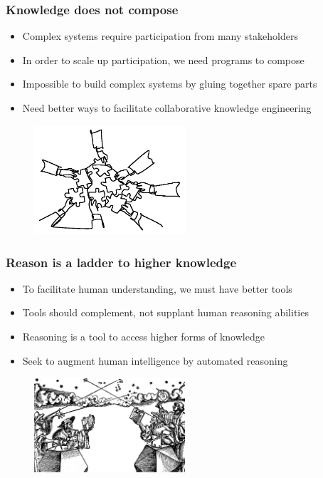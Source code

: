 \documentclass{beamer}
\begin{document}
\begin{frame}
  \frametitle{Knowledge does not compose}
  \begin{itemize}
    \item Complex systems require participation from many stakeholders
    \item In order to scale up participation, we need programs to compose
    \item Impossible to build complex systems by gluing together spare parts
    \item Need better ways to facilitate collaborative knowledge engineering
  \end{itemize}
  \begin{figure}[H]
    \centering
    \includegraphics[width=0.5\textwidth]{../clipart/compositionality.jpeg}
  \end{figure}
\end{frame}

\begin{frame}
  \frametitle{Reason is a ladder to higher knowledge}
  \begin{itemize}
    \item To facilitate human understanding, we must have better tools
    \item Tools should complement, not supplant human reasoning abilities
    \item Reasoning is a tool to access higher forms of knowledge
    \item Seek to augment human intelligence by automated reasoning
  \end{itemize}
  \begin{figure}[H]
    \centering
    \includegraphics[width=0.5\textwidth]{../clipart/astronomers.png}
  \end{figure}
\end{frame}
\end{document}
